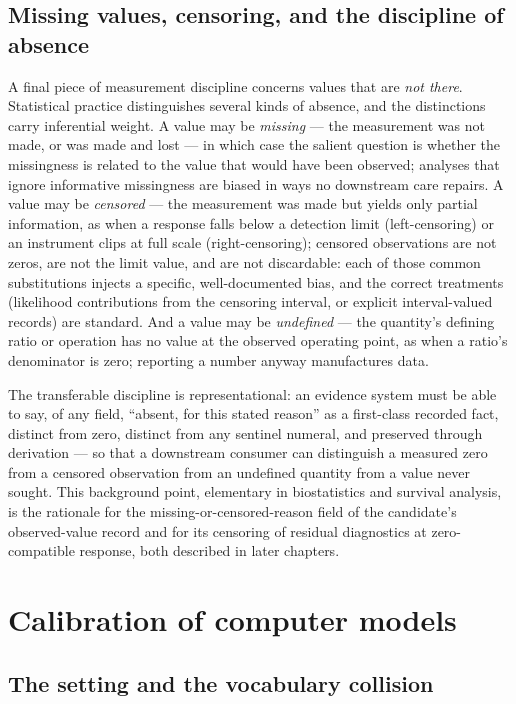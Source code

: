 \subsection{Missing values, censoring, and the discipline of absence}\label{ch02:metrology:censoring}

A final piece of measurement discipline concerns values that are \emph{not there}. Statistical practice distinguishes several kinds of absence, and the distinctions carry inferential weight. A value may be \emph{missing} --- the measurement was not made, or was made and lost --- in which case the salient question is whether the missingness is related to the value that would have been observed; analyses that ignore informative missingness are biased in ways no downstream care repairs. A value may be \emph{censored} --- the measurement was made but yields only partial information, as when a response falls below a detection limit (left-censoring) or an instrument clips at full scale (right-censoring); censored observations are not zeros, are not the limit value, and are not discardable: each of those common substitutions injects a specific, well-documented bias, and the correct treatments (likelihood contributions from the censoring interval, or explicit interval-valued records) are standard. And a value may be \emph{undefined} --- the quantity's defining ratio or operation has no value at the observed operating point, as when a ratio's denominator is zero; reporting a number anyway manufactures data.

The transferable discipline is representational: an evidence system must be able to say, of any field, ``absent, for this stated reason'' as a first-class recorded fact, distinct from zero, distinct from any sentinel numeral, and preserved through derivation --- so that a downstream consumer can distinguish a measured zero from a censored observation from an undefined quantity from a value never sought. This background point, elementary in biostatistics and survival analysis, is the rationale for the missing-or-censored-reason field of the candidate's observed-value record and for its censoring of residual diagnostics at zero-compatible response, both described in later chapters.

\section{Calibration of computer models}\label{ch02:calibration}

\subsection{The setting and the vocabulary collision}\label{ch02:calibration:setting}

